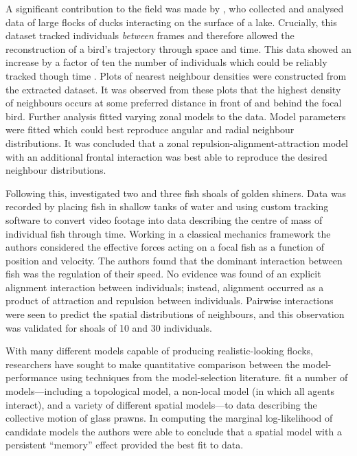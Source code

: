 A significant contribution to the field was made by \textcite{lukeman10}, who
collected and analysed data of large flocks of ducks interacting on the surface
of a lake. Crucially, this dataset tracked individuals \emph{between} frames
and therefore allowed the reconstruction of a bird's trajectory through space
and time. This data showed an increase by a factor of ten the number of
individuals which could be reliably tracked though time \parencite{lukeman09}.
Plots of nearest neighbour densities were constructed from the extracted
dataset. It was observed from these plots that the highest density of
neighbours occurs at some preferred distance in front of and behind the focal
bird. Further analysis fitted varying zonal models to the data. Model
parameters were fitted which could best reproduce angular and radial neighbour
distributions. It was concluded that a zonal repulsion-alignment-attraction
model with an additional frontal interaction was best able to reproduce the
desired neighbour distributions.

Following this, \cite{katz11} investigated two and three fish shoals of golden
shiners. Data was recorded by placing fish in shallow tanks of water and using
custom tracking software to convert video footage into data describing the
centre of mass of individual fish through time. Working in a classical
mechanics framework the authors considered the effective forces acting on a
focal fish as a function of position and velocity. The authors found that the
dominant interaction between fish was the regulation of their speed. No
evidence was found of an explicit alignment interaction between individuals;
instead, alignment occurred as a product of attraction and repulsion between
individuals. Pairwise interactions were seen to predict the spatial
distributions of neighbours, and this observation was validated for shoals of
10 and 30 individuals.

With many different models capable of producing realistic-looking flocks,
researchers have sought to make quantitative comparison between the
model-performance using techniques from the model-selection literature.
\textcite{mann13} fit a number of models---including a topological model, a
non-local model (in which all agents interact), and a variety of different
spatial models---to data describing the collective motion of glass prawns. In
computing the marginal log-likelihood of candidate models the authors were able
to conclude that a spatial model with a persistent ``memory'' effect provided
the best fit to data.


